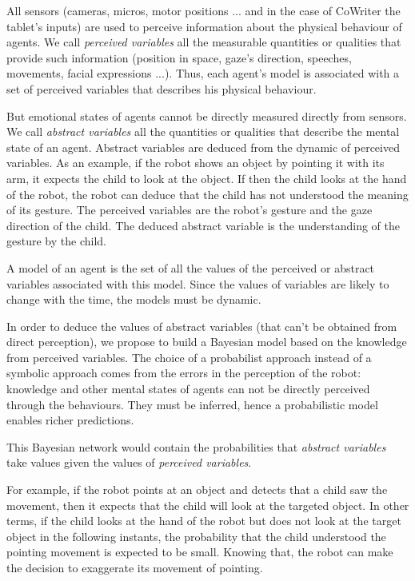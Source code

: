 \documentclass[conference]{IEEEtran}
\begin{document}
All sensors (cameras, micros, motor positions ... and in the case of CoWriter the tablet's inputs) are used to
perceive information about the physical behaviour of agents. We call \textit{perceived variables} all the measurable quantities or qualities that provide such information (position in space, gaze's direction, speeches, movements, facial expressions ...). Thus, each agent's model is associated with a set of perceived variables that describes his physical behaviour.

But emotional states of agents cannot be directly measured directly from sensors. We call \textit{abstract variables} all the quantities or qualities that describe the mental state of an agent. Abstract variables are deduced from the dynamic of perceived variables. As an example, if the robot shows an object by pointing it with its arm, it expects the child to look at the object. If then the child looks at the hand of the robot, the robot can deduce that the child has not understood the meaning of its gesture. The perceived variables are the robot's gesture and the gaze direction of the child. The deduced abstract variable is the understanding of the gesture by the child. 

A model of an agent is the set of all the values of the perceived or abstract variables associated with this model. Since the values of variables are likely to change with the time, the models must be dynamic.


In order to deduce the values of abstract variables (that can't be obtained from direct perception),
we propose to build a Bayesian model based on the knowledge from perceived variables. 
The choice of a probabilist approach instead of a symbolic approach comes from the errors in the perception of the robot: knowledge and other mental states of agents can not be directly perceived through the behaviours. They must be inferred, hence a probabilistic model enables
richer predictions.

This Bayesian network would contain the probabilities that \emph{abstract variables} take values given the values of \emph{perceived variables}. 

For example, if the robot points at an object and detects that a child saw the movement,
then it expects that the child will look at the targeted object. 
In other terms, if the child looks at the hand of the robot but does not look at the target object in the following instants,  
the probability that the child understood the pointing movement is expected to be small.
Knowing that, the robot can make the decision to exaggerate its movement of pointing. 
\end{document}
